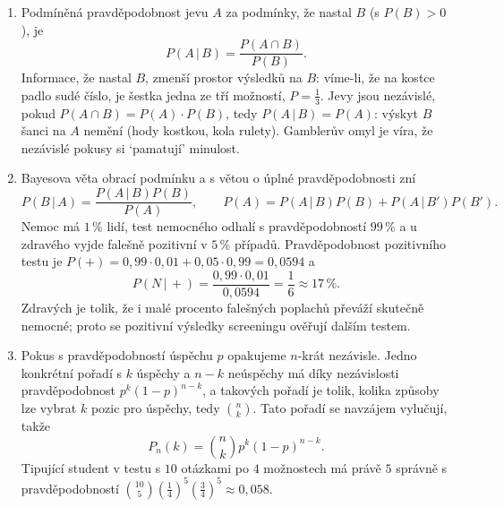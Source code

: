 \begin{enumerate}[label=\textbf{\arabic*.}, leftmargin=*, itemsep=0.8em]
  \item {}
  Podmíněná pravděpodobnost jevu $A$ za podmínky, že nastal $B$ (s $P(B) > 0$), je
  \begin{equation*}
    P(A\,|\,B) = \frac{P(A\cap B)}{P(B)}.
  \end{equation*}
  Informace, že nastal $B$, zmenší prostor výsledků na $B$: víme-li, že na kostce padlo sudé číslo, je šestka jedna ze tří možností, $P = \frac{1}{3}$. Jevy jsou nezávislé, pokud $P(A\cap B) = P(A)\cdot P(B)$, tedy $P(A\,|\,B) = P(A)$: výskyt $B$ šanci na $A$ nemění (hody kostkou, kola rulety). Gamblerův omyl je víra, že nezávislé pokusy si `pamatují' minulost. 

  \item {}
  Bayesova věta obrací podmínku a s větou o úplné pravděpodobnosti zní
  \begin{equation*}
    P(B\,|\,A) = \frac{P(A\,|\,B)P(B)}{P(A)}, \qquad P(A) = P(A\,|\,B)P(B) + P(A\,|\,B')P(B').
  \end{equation*}
  Nemoc má $1\,\%$ lidí, test nemocného odhalí s pravděpodobností $99\,\%$ a u zdravého vyjde falešně pozitivní v $5\,\%$ případů. Pravděpodobnost pozitivního testu je $P(+) = 0{,}99\cdot 0{,}01 + 0{,}05\cdot 0{,}99 = 0{,}0594$ a
  \begin{equation*}
    P(N\,|\,+) = \frac{0{,}99\cdot 0{,}01}{0{,}0594} = \frac{1}{6}\approx 17\,\%.
  \end{equation*}
  Zdravých je tolik, že i malé procento falešných poplachů převáží skutečně nemocné; proto se pozitivní výsledky screeningu ověřují dalším testem. 

  \item {}
  Pokus s pravděpodobností úspěchu $p$ opakujeme $n$-krát nezávisle. Jedno konkrétní pořadí s $k$ úspěchy a $n - k$ neúspěchy má díky nezávislosti pravděpodobnost $p^k{(1 - p)}^{n-k}$, a takových pořadí je tolik, kolika způsoby lze vybrat $k$ pozic pro úspěchy, tedy $\binom{n}{k}$. Tato pořadí se navzájem vylučují, takže
  \begin{equation*}
    P_n(k) = \binom{n}{k}p^k{(1 - p)}^{n - k}.
  \end{equation*}
  Tipující student v testu s $10$ otázkami po $4$ možnostech má právě $5$ správně s pravděpodobností $\binom{10}{5}{\left(\frac{1}{4}\right)}^5{\left(\frac{3}{4}\right)}^5\approx 0{,}058$. 


\end{enumerate}
